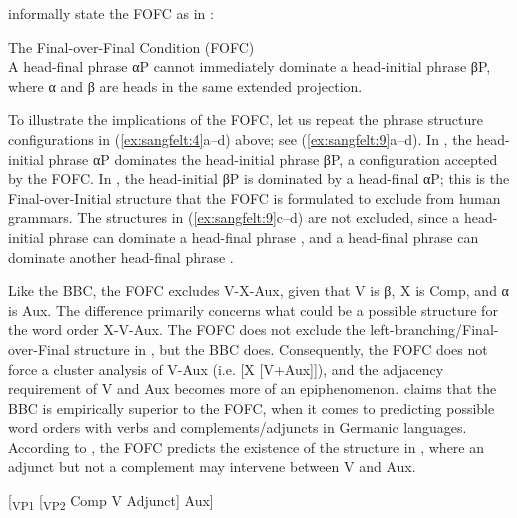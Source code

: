 \documentclass[output=paper, colorlinks, citecolor=brown]{langscibook}
\begin{document}
\citet[171]{BiberauerEtAl2014} informally state the FOFC as in : 

\ea The Final-over-Final Condition (FOFC)\label{ex:sangfelt:8}\\
A head-final phrase αP cannot immediately dominate a head-initial phrase βP, where
α and β are heads in the same extended projection.
\z 

To illustrate the implications of the FOFC, let us repeat the phrase structure configurations in (\ref{ex:sangfelt:4}a–d) above; see (\ref{ex:sangfelt:9}a–d). In , the head-initial phrase αP dominates the head-initial phrase βP, a configuration accepted by the FOFC. In , the head-initial βP is dominated by a head-final αP; this is the Final-over-Initial structure that the FOFC is formulated to exclude from human grammars. The structures in (\ref{ex:sangfelt:9}c–d) are not excluded, since a head-initial phrase can dominate a head-final phrase , and a head-final phrase can dominate another head-final phrase .

\settowidth{}
\ea\label{ex:sangfelt:9}
\z 
\z 


Like the BBC, the FOFC excludes V-X-Aux, given that V is β, X is Comp, and α is Aux. The difference primarily concerns what could be a possible structure for the word order X-V-Aux. The FOFC does not exclude the left-branching/Final-over-Final structure in , but the BBC does. Consequently, the FOFC does not force a cluster analysis of V-Aux (i.e. [X [V+Aux]]), and the adjacency requirement of V and Aux becomes more of an epiphenomenon. \citet[132--133]{Haider2013} claims that the BBC is empirically superior to the FOFC, when it comes to predicting possible word orders with verbs and complements\slash adjuncts in Germanic languages. According to \citet[133]{Haider2013}, the FOFC predicts the existence of the structure in , where an adjunct but not a complement may intervene between V and Aux.


\ea {}[\textsubscript{VP1} [\textsubscript{VP2} {Comp} {V} {Adjunct}] {Aux}]\label{ex:sangfelt:10}\z
\end{document}
